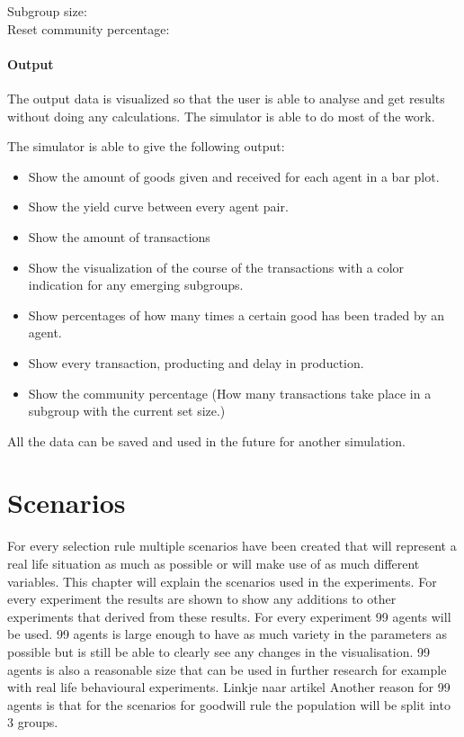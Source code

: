 \documentclass[twoside,openright]{uva-bachelor-thesis}
\begin{document}
\begin{description}
  \item[Subgroup size:] 
  \item[Reset community percentage:] 

\end{description}
\subsubsection{Output}
The output data is visualized so that the user is able to analyse and get results without doing any calculations. The simulator is able to do most of the work.

The simulator is able to give the following output:
\begin{itemize}
  \item Show the amount of goods given and received for each agent in a bar plot.
  \item Show the yield curve between every agent pair.
  \item Show the amount of transactions
  \item Show the visualization of the course of the transactions with a color indication for any emerging subgroups.
  \item Show percentages of how many times a certain good has been traded by an agent.
  \item Show every transaction, producting and delay in production.
  \item Show the community percentage (How many transactions take place in a subgroup with the current set size.)
\end{itemize}

All the data can be saved and used in the future for another simulation.


\chapter{Scenarios}
For every selection rule multiple scenarios have been created that will represent a real life situation as much as possible or will make use of as much different variables.  This chapter will explain the scenarios used in the experiments. For every experiment the results are shown to show any additions to other experiments that derived from these results.
For every experiment 99 agents will be used. 99 agents is large enough to have as much variety in the parameters as possible but is still be able to clearly see any changes in the visualisation. 99 agents is also a reasonable size that can be used in further research for example with real life behavioural experiments. Linkje naar artikel Another reason for 99 agents is that for the scenarios for goodwill rule the population will be split into 3 groups.
\end{document}
